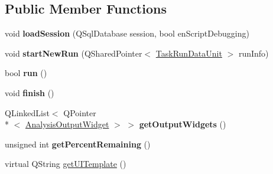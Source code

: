 \subsection*{Public Member Functions}
\begin{DoxyCompactItemize}
\item 
\hypertarget{class_picto_1_1_analysis_definition_a219236446150ac0efcddcdd966761391}{void {\bfseries load\-Session} (Q\-Sql\-Database session, bool en\-Script\-Debugging)}\label{class_picto_1_1_analysis_definition_a219236446150ac0efcddcdd966761391}

\item 
\hypertarget{class_picto_1_1_analysis_definition_a58fe9db1454432ae10bdde1a60deb3fa}{void {\bfseries start\-New\-Run} (Q\-Shared\-Pointer$<$ \hyperlink{class_picto_1_1_task_run_data_unit}{Task\-Run\-Data\-Unit} $>$ run\-Info)}\label{class_picto_1_1_analysis_definition_a58fe9db1454432ae10bdde1a60deb3fa}

\item 
\hypertarget{class_picto_1_1_analysis_definition_a15c152132a75e613ecf9aab81f66f85a}{bool {\bfseries run} ()}\label{class_picto_1_1_analysis_definition_a15c152132a75e613ecf9aab81f66f85a}

\item 
\hypertarget{class_picto_1_1_analysis_definition_a514ca30a5458c24c977eb5d898f0b3be}{void {\bfseries finish} ()}\label{class_picto_1_1_analysis_definition_a514ca30a5458c24c977eb5d898f0b3be}

\item 
\hypertarget{class_picto_1_1_analysis_definition_a9707b82a5df541716265f5ff03bacd81}{Q\-Linked\-List$<$ Q\-Pointer\\*
$<$ \hyperlink{class_picto_1_1_analysis_output_widget}{Analysis\-Output\-Widget} $>$ $>$ {\bfseries get\-Output\-Widgets} ()}\label{class_picto_1_1_analysis_definition_a9707b82a5df541716265f5ff03bacd81}

\item 
\hypertarget{class_picto_1_1_analysis_definition_ae76cffc40090d3165621da3df9b662d3}{unsigned int {\bfseries get\-Percent\-Remaining} ()}\label{class_picto_1_1_analysis_definition_ae76cffc40090d3165621da3df9b662d3}

\item 
\hypertarget{class_picto_1_1_analysis_definition_a842579c560ac9f932bf2271450965d8e}{virtual Q\-String \hyperlink{class_picto_1_1_analysis_definition_a842579c560ac9f932bf2271450965d8e}{get\-U\-I\-Template} ()}\label{class_picto_1_1_analysis_definition_a842579c560ac9f932bf2271450965d8e}


\end{DoxyCompactItemize}
